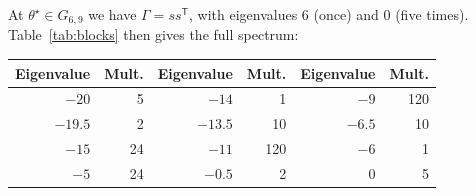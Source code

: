 \documentclass[11pt,a4paper]{article}
\theoremstyle{definition}\newtheorem{conjecture}{Conjecture}
\theoremstyle{remark}\newtheorem{remark}[theorem]{Remark}
\begin{document}
At $\theta^\star\in G_{6,9}$ we have $\Gamma=ss^{\mathsf T}$, with eigenvalues $6$ (once) and $0$ (five times). Table~\ref{tab:blocks} then gives the full spectrum:
\begin{center}\small
\begin{tabular}{rr@{\qquad}rr@{\qquad}rr}\toprule
Eigenvalue & Mult. & Eigenvalue & Mult. & Eigenvalue & Mult.\\\midrule
$-20$ & 5 & $-14$ & 1 & $-9$ & 120\\
$-19.5$ & 2 & $-13.5$ & 10 & $-6.5$ & 10\\
$-15$ & 24 & $-11$ & 120 & $-6$ & 1\\
$-5$ & 24 & $-0.5$ & 2 & $0$ & 5\\\bottomrule
\end{tabular}
\end{center}
\end{document}
